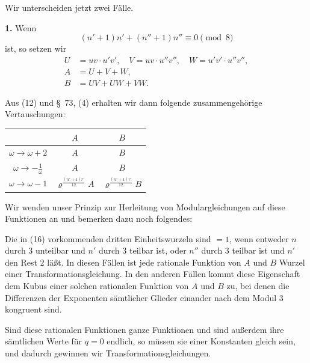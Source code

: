 \documentclass[12pt,a4paper]{article}
\theoremstyle{definition}
\begin{document}
Wir unterscheiden jetzt zwei Fälle.

\textbf{1.} Wenn
\begin{equation}\label{eq:76-13}
(n'+1)n' + (n''+1)n'' \equiv 0 \pmod{8}
\end{equation}
ist, so setzen wir
\begin{equation}\label{eq:76-14}
\begin{aligned}
U &= uv \cdot u'v', \quad V = uv \cdot u''v'', \quad W = u'v' \cdot u''v'', \\
A &= U + V + W, \\
B &= UV + UW + VW.
\end{aligned}
\end{equation}

Aus (12) und \S\ 73, (4) erhalten wir dann folgende zusammengehörige Vertauschungen:

\begin{center}
\begin{tabular}{c|cc}
& $A$ & $B$ \\
\midrule
$\omega \to \omega + 2$ & $A$ & $B$ \\
$\omega \to -\frac{1}{\omega}$ & $A$ & $B$ \\
$\omega \to \omega - 1$ & $\varrho^{\frac{(n'+1)r'}{12}} A$ & $\varrho^{\frac{(n'+1)r'}{12}} B$ \\
\end{tabular}
\end{center}

Wir wenden unser Prinzip zur Herleitung von Modulargleichungen auf diese Funktionen an und bemerken dazu noch folgendes:

Die in (16) vorkommenden dritten Einheitswurzeln sind $= 1$, wenn entweder $n$ durch 3 unteilbar und $n'$ durch 3 teilbar ist, oder $n''$ durch 3 teilbar ist und $n'$ den Rest 2 läßt. In diesen Fällen ist jede rationale Funktion von $A$ und $B$ Wurzel einer Transformationsgleichung. In den anderen Fällen kommt diese Eigenschaft dem Kubus einer solchen rationalen Funktion von $A$ und $B$ zu, bei denen die Differenzen der Exponenten sämtlicher Glieder einander nach dem Modul 3 kongruent sind.

Sind diese rationalen Funktionen ganze Funktionen und sind außerdem ihre sämtlichen Werte für $q = 0$ endlich, so müssen sie einer Konstanten gleich sein, und dadurch gewinnen wir Transformationsgleichungen.
\end{document}
